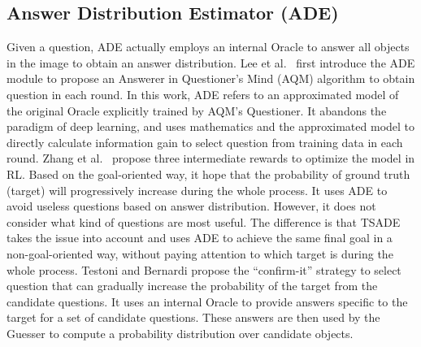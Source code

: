\subsection{Answer Distribution Estimator (ADE)}
Given a question, ADE actually employs an internal Oracle to answer all objects in the image to obtain an answer distribution. Lee et al.~ first introduce the ADE module to propose an Answerer in Questioner’s Mind (AQM) algorithm to obtain question in each round.
In this work, ADE refers to an approximated model of the original Oracle explicitly trained by AQM's Questioner. 
It abandons the paradigm of deep learning, and uses mathematics and the approximated model to directly calculate information gain to select question from training data in each round. 
Zhang et al.~ propose three intermediate rewards to optimize the model in RL. 
Based on the goal-oriented way, it hope that the probability of ground truth (target) will progressively increase during the whole process. It uses ADE to avoid useless questions based on answer distribution. However, it does not consider what kind of questions are most useful. The difference is that TSADE takes the issue into account and uses ADE to achieve the same final goal in a non-goal-oriented way, without paying attention to which target is during the whole process.
Testoni and Bernardi  propose the ``confirm-it'' strategy to select question that can gradually increase the probability of the target from the candidate questions. It uses an internal Oracle to provide answers specific to the target for a set of candidate questions. These answers are then used by the Guesser to compute a probability distribution over candidate objects. 
